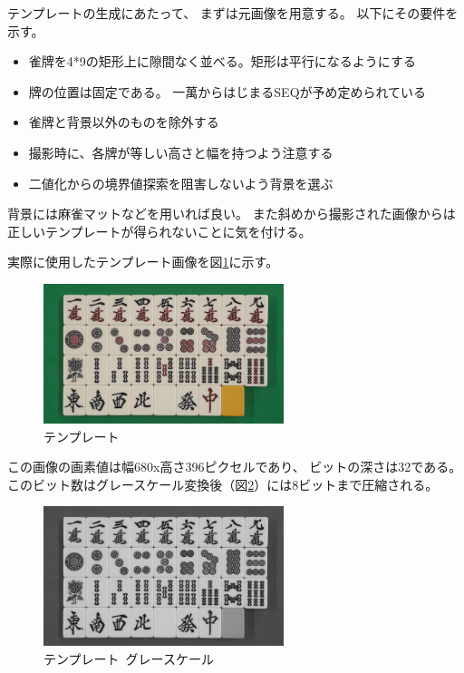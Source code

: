 \documentclass{jsarticle}
\begin{document}
\begin{multicols}{2}
テンプレートの生成にあたって、
まずは元画像を用意する。
以下にその要件を示す。
\begin{itemize}
\item 雀牌を4*9の矩形上に隙間なく並べる。矩形は平行になるようにする
\item 牌の位置は固定である。
		  一萬からはじまるSEQが予め定められている
\item 雀牌と背景以外のものを除外する
\item 撮影時に、各牌が等しい高さと幅を持つよう注意する
\item 二値化からの境界値探索を阻害しないよう背景を選ぶ
\end{itemize}

背景には麻雀マットなどを用いれば良い。
また斜めから撮影された画像からは正しいテンプレートが得られないことに気を付ける。

実際に使用したテンプレート画像を図\ref{fig:template}に示す。

\begin{figure}[H]
  \begin{center}
    \includegraphics[clip,width=7.0cm]{./img/template.png}
    \caption{テンプレート}
    \label{fig:template}
  \end{center}
\end{figure}

この画像の画素値は幅680x高さ396ピクセルであり、
ビットの深さは32である。
このビット数はグレースケール変換後（図\ref{fig:templateGray}）には8ビットまで圧縮される。

\begin{figure}[H]
  \begin{center}
    \includegraphics[clip,width=7.0cm]{./img/template_gray.png}
    \caption{テンプレート\ グレースケール}
    \label{fig:templateGray}
  \end{center}
\end{figure}


\end{multicols}
\end{document}
